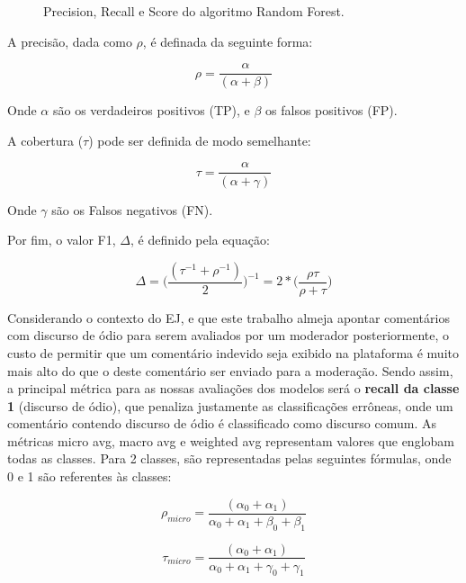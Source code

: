 \begin{figure}[!htb]
    \caption{\label{fig:jupyter} Precision, Recall e Score do algoritmo Random Forest.}
\end{figure}

 A precisão, dada como $\rho$, é definada da seguinte forma:
 
 $$ \rho=\frac{\alpha}{(\alpha+\beta)} $$

Onde $\alpha$ são os verdadeiros positivos (TP), e $\beta$ os falsos positivos (FP).

A cobertura ($\tau$) pode ser definida de modo semelhante:

$$ \tau = \frac{\alpha}{(\alpha+\gamma)}$$

Onde $\gamma$ são os Falsos negativos (FN).

Por fim, o valor F1, $\Delta$, é definido pela equação:

$$\Delta = \Bigg(\frac{(\tau^{-1} + \rho^{-1})}{2}\Bigg)^{-1} =2*\Bigg(\frac{\rho\tau}{\rho+\tau}\Bigg)$$

Considerando o contexto do EJ, e que este trabalho almeja apontar comentários com discurso de ódio para serem avaliados por um moderador posteriormente, o custo de permitir que um comentário indevido seja exibido na plataforma é muito mais alto do que o deste comentário ser enviado para a moderação. Sendo assim, a principal métrica para as nossas avaliações dos modelos será o \textbf{recall da classe 1} (discurso de ódio), que penaliza justamente as classificações errôneas, onde um comentário contendo discurso de ódio é classificado como discurso comum.
As métricas micro avg, macro avg e weighted avg representam valores que englobam todas as classes. Para 2 classes, são representadas pelas seguintes fórmulas, onde 0 e 1 são referentes às classes:


$$ 
\rho_{micro} = 
\frac{(\alpha_0+\alpha_1)}{\alpha_0+\alpha_1+\beta_0+\beta_1} 
$$

$$ 
\tau_{micro} = 
\frac{(\alpha_0+\alpha_1)}{\alpha_0+\alpha_1+\gamma_0+\gamma_1} 
$$

